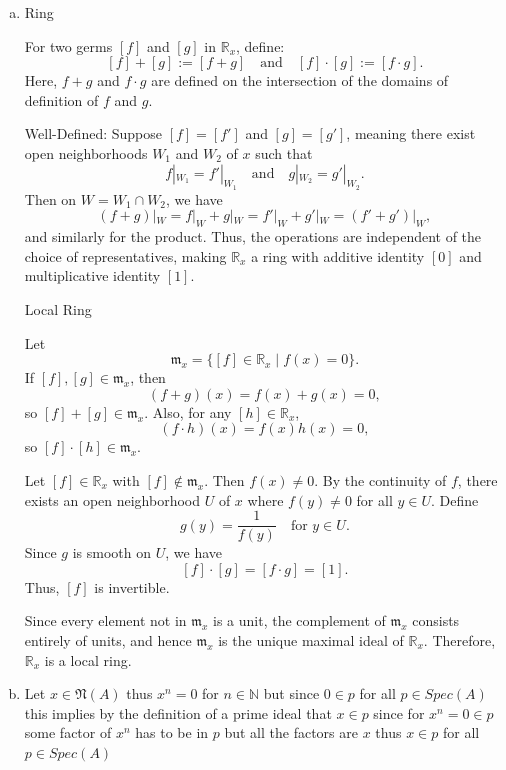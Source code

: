 \documentclass[12pt, letterpaper]{article}
\newcommand{\N}{\mathbb{N}}
\begin{document}
\begin{enumerate}[(a)]
    If $P\diagup(p)=(0)$ then $P=(p)$.

    If $P \diagup (p) \neq (p)$ then it will equal $P \diagup (p) = (f(X))$ where $f(X)$ is an irreducible polynomial mod $p$. Thus, $P=(p,f(X))$


    \addtocounter{enumi}{2} \item 
    Ring
    
    For two germs $[f]$ and $[g]$ in $\mathbb{R}_x$, define:
    \[
    [f] + [g] := [f+g] \quad \text{and} \quad [f] \cdot [g] := [f \cdot g].
    \]
    Here, $f+g$ and $f\cdot g$ are defined on the intersection of the domains of definition of $f$ and $g$. 
    
    Well-Defined: Suppose $[f]=[f']$ and $[g]=[g']$, meaning there exist open neighborhoods $W_1$ and $W_2$ of $x$ such that
    \[
    f|_{W_1} = f'|_{W_1} \quad \text{and} \quad g|_{W_2} = g'|_{W_2}.
    \]
    Then on $W = W_1\cap W_2$, we have
    \[
    (f+g)|_W = f|_W + g|_W = f'|_W + g'|_W = (f'+g')|_W,
    \]
    and similarly for the product. Thus, the operations are independent of the choice of representatives, making $\mathbb{R}_x$ a ring with additive identity $[0]$ and multiplicative identity $[1]$.
    
    
    Local Ring
    
    Let
    \[
    \mathfrak{m}_x = \{ [f] \in \mathbb{R}_x \mid f(x)=0 \}.
    \]
    If $[f], [g] \in \mathfrak{m}_x$, then
    \[
    (f+g)(x)=f(x)+g(x)=0,
    \]
    so $[f]+[g] \in \mathfrak{m}_x$. Also, for any $[h]\in \mathbb{R}_x$,
    \[
    (f\cdot h)(x)=f(x)h(x)=0,
    \]
    so $[f]\cdot[h] \in \mathfrak{m}_x$.
    
    Let $[f]\in \mathbb{R}_x$ with $[f]\notin \mathfrak{m}_x$. Then $f(x)\neq 0$. By the continuity of $f$, there exists an open neighborhood $U$ of $x$ where $f(y)\neq 0$ for all $y\in U$. Define
    \[
    g(y)=\frac{1}{f(y)} \quad \text{for } y\in U.
    \]
    Since $g$ is smooth on $U$, we have
    \[
    [f]\cdot [g] = [f\cdot g] = [1].
    \]
    Thus, $[f]$ is invertible.
    
    \vspace{0.5em}
    
    Since every element not in $\mathfrak{m}_x$ is a unit, the complement of $\mathfrak{m}_x$ consists entirely of units, and hence $\mathfrak{m}_x$ is the unique maximal ideal of $\mathbb{R}_x$. Therefore, $\mathbb{R}_x$ is a local ring.    

    \item Let $x \in \mathfrak{N}(A)$ thus $x^n=0$ for $n \in \N$ but since $0 \in p$ for all $p \in Spec(A)$ this implies by the definition of a prime ideal that $x \in p$ since for $x^n=0 \in p$ some factor of $x^n$ has to be in $p$ but all the factors are $x$ thus $x \in p$ for all $p \in Spec(A)$
    

\end{enumerate}
\end{document}
